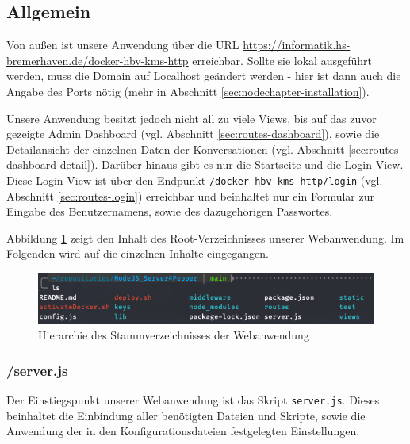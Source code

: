\subsection{Allgemein}
Von außen ist unsere Anwendung über die URL
\href{https://informatik.hs-bremerhaven.de/docker-hbv-kms-http}{https://informatik.hs-bremerhaven.de/docker-hbv-kms-http} erreichbar. Sollte sie lokal ausgeführt werden, muss die Domain auf Localhost geändert werden - hier ist dann auch die Angabe des Ports nötig (mehr in Abschnitt \ref{sec:nodechapter-installation}).

Unsere Anwendung besitzt jedoch nicht all zu viele Views, bis auf das zuvor gezeigte Admin Dashboard (vgl. Abschnitt \ref{sec:routes-dashboard}), sowie die Detailansicht der einzelnen Daten der Konversationen (vgl. Abschnitt \ref{sec:routes-dashboard-detail}). Darüber hinaus gibt es nur die Startseite und die Login-View. Diese Login-View ist über den Endpunkt \verb|/docker-hbv-kms-http/login| (vgl. Abschnitt \ref{sec:routes-login}) erreichbar und beinhaltet nur ein Formular zur Eingabe des Benutzernamens, sowie des dazugehörigen Passwortes.

Abbildung \ref{fig:webhierarchie} zeigt den Inhalt des Root-Verzeichnisses unserer Webanwendung. Im Folgenden wird auf die einzelnen Inhalte eingegangen. \\

\begin{figure}[H]
    \includegraphics[width=\textwidth]{Figures/NodeChapter/ServerFileStructure.png}
    \caption{Hierarchie des Stammverzeichnisses der Webanwendung}
    \label{fig:webhierarchie}
    \centering
\end{figure}

\subsubsection*{/server.js}
Der Einstiegspunkt unserer Webanwendung ist das Skript \verb|server.js|. Dieses beinhaltet die Einbindung aller benötigten Dateien und Skripte, sowie die Anwendung der in den Konfigurationsdateien festgelegten Einstellungen.

